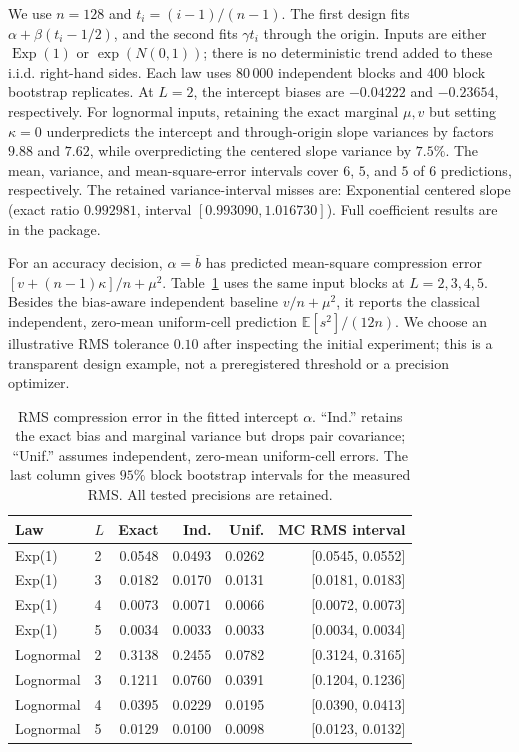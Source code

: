 We use $n=128$ and $t_i=(i-1)/(n-1)$. The first design fits
$\alpha+\beta(t_i-1/2)$, and the second fits $\gamma t_i$ through the
origin. Inputs are either $\operatorname{Exp}(1)$ or
$\exp(N(0,1))$; there is no deterministic trend added to these i.i.d.
right-hand sides. Each law uses $80\,000$ independent blocks and $400$
block bootstrap replicates. At $L=2$, the intercept biases are $-0.04222$
and $-0.23654$, respectively. For lognormal inputs, retaining the exact
marginal $\mu,v$ but setting $\kappa=0$ underpredicts the intercept and
through-origin slope variances by factors $9.88$ and $7.62$,
while overpredicting the centered slope variance by $7.5\%$.
The mean, variance, and mean-square-error intervals cover $6$,
$5$, and $5$ of $6$ predictions, respectively.
The retained variance-interval misses are: Exponential centered slope (exact ratio $0.992981$, interval $[0.993090,1.016730]$). Full coefficient results are in the package.

For an accuracy decision, $\alpha=\overline b$ has predicted mean-square
compression error
$[v+(n-1)\kappa]/n+\mu^2$. Table~\ref{tab:revision-ls} uses the same
input blocks at $L=2,3,4,5$. Besides the bias-aware independent baseline
$v/n+\mu^2$, it reports the classical independent, zero-mean uniform-cell
prediction $\mathbb E[s^2]/(12n)$. We choose an illustrative RMS tolerance
$0.10$ after inspecting the initial experiment; this is a transparent
design example, not a preregistered threshold or a precision optimizer.

\begin{table}[tb]
\centering
\caption{RMS compression error in the fitted intercept $\alpha$.
``Ind.'' retains the exact bias and marginal variance but drops pair
covariance; ``Unif.'' assumes independent, zero-mean uniform-cell errors.
The last column gives $95\%$ block bootstrap intervals for the measured
RMS. All tested precisions are retained.}
\label{tab:revision-ls}
\begingroup\footnotesize\setlength{\tabcolsep}{3pt}
\begin{tabular}{llrrrr}
\toprule
Law & $L$ & Exact & Ind. & Unif. & MC RMS interval\\
\midrule
Exp(1) & 2 & 0.0548 & 0.0493 & 0.0262 & [0.0545, 0.0552] \\
Exp(1) & 3 & 0.0182 & 0.0170 & 0.0131 & [0.0181, 0.0183] \\
Exp(1) & 4 & 0.0073 & 0.0071 & 0.0066 & [0.0072, 0.0073] \\
Exp(1) & 5 & 0.0034 & 0.0033 & 0.0033 & [0.0034, 0.0034] \\
Lognormal & 2 & 0.3138 & 0.2455 & 0.0782 & [0.3124, 0.3165] \\
Lognormal & 3 & 0.1211 & 0.0760 & 0.0391 & [0.1204, 0.1236] \\
Lognormal & 4 & 0.0395 & 0.0229 & 0.0195 & [0.0390, 0.0413] \\
Lognormal & 5 & 0.0129 & 0.0100 & 0.0098 & [0.0123, 0.0132] \\
\bottomrule
\end{tabular}\endgroup
\end{table}

